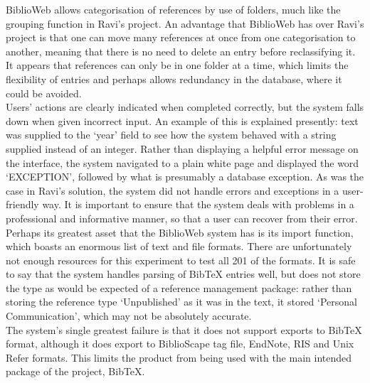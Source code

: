 \documentclass{l4proj}
\newcommand{\BibTeX}{B{\sc ib}\TeX}
\newcommand{\bibtex}{\BibTeX}
\begin{document}
BiblioWeb allows categorisation of references by use of folders, much like the grouping function in Ravi's project.  An advantage that BiblioWeb has over Ravi's project is that one can move many references at once from one categorisation to another, meaning that there is no need to delete an entry before reclassifying it.  It appears that references can only be in one folder at a time, which limits the flexibility of entries and perhaps allows redundancy in the database, where it could be avoided.\\

Users' actions are clearly indicated when completed correctly, but the system falls down when given incorrect input.  An example of this is explained presently: text was supplied to the `year' field to see how the system behaved with a string supplied instead of an integer.  Rather than displaying a helpful error message on the interface, the system navigated to a plain white page and displayed the word `EXCEPTION', followed by what is presumably a database exception.  As was the case in Ravi's solution, the system did not handle errors and exceptions in a user-friendly way.  It is important to ensure that the system deals with problems in a professional and informative manner, so that a user can recover from their error.\\

Perhaps its greatest asset that the BiblioWeb system has is its import function, which boasts an enormous list of text and file formats.  There are unfortunately not enough resources for this experiment to test all 201 of the formats.  It is safe to say that the system handles parsing of \bibtex{} entries well, but does not store the type as would be expected of a reference management package: rather than storing the reference type `Unpublished' as it was in the text, it stored `Personal Communication', which may not be absolutely accurate.\\

The system's single greatest failure is that it does not support exports to \bibtex{} format, although it does export to BiblioScape tag file, EndNote, RIS and Unix Refer formats.  This limits the product from being used with the main intended package of the project, \bibtex.

\end{document}
